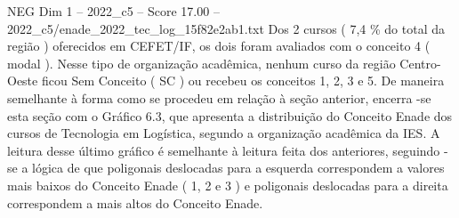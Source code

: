 \begin{textsample}{NEG Dim 1 – 2022\_c5 – Score 17.00 – 2022\_c5/enade\_2022\_tec\_log\_15f82e2ab1.txt}
Dos 2 cursos ( 7,4 \% do total da região ) oferecidos em CEFET/IF, os dois foram avaliados com o conceito 4 ( modal ).
Nesse tipo de organização acadêmica, nenhum curso da região Centro-Oeste ficou Sem Conceito ( SC ) ou recebeu os conceitos 1, 2, 3 e 5.
De maneira semelhante à forma como se procedeu em relação à seção anterior, encerra -se esta seção com o Gráfico 6.3, que apresenta a distribuição do Conceito Enade dos cursos de Tecnologia em Logística, segundo a organização acadêmica da IES.
A leitura desse último gráfico é semelhante à leitura feita dos anteriores, seguindo -se a lógica de que poligonais deslocadas para a esquerda correspondem a valores mais baixos do Conceito Enade ( 1, 2 e 3 ) e poligonais deslocadas para a direita correspondem a mais altos do Conceito Enade.

\end{textsample}
